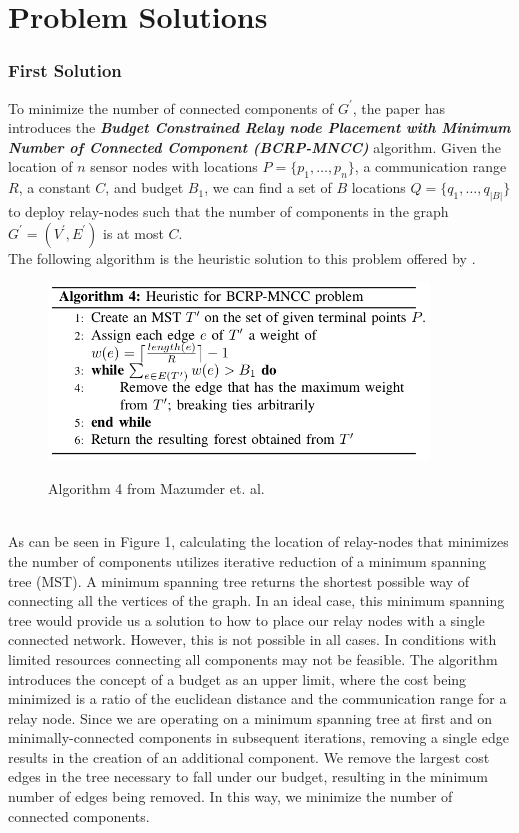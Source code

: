 \documentclass{article}
\begin{document}
\section{Problem Solutions}
\subsubsection*{First Solution}
To minimize the number of connected components of $G^\prime$, the paper \cite{relay-node} has introduces the \textbf{\textit{Budget Constrained Relay node Placement with Minimum Number of Connected Component (BCRP-MNCC)}} algorithm.
Given the location of $n$ sensor nodes with locations $P=\{p_1, \hdots, p_n\}$, a communication range $R$, a constant $C$, and budget $B_1$, we can find a set of $B$ locations $Q=\{q_1, \hdots, q_{|B|}\}$ to deploy relay-nodes such that the number of components in the graph $G^\prime=(V^\prime, E^\prime)$ is at most $C$.\\
The following algorithm is the heuristic solution to this problem offered by \cite{relay-node}.
\begin{figure}[h]
\centering
\includegraphics[width=0.9\textwidth]{Alg4.png}
\label{alg4}
\caption{Algorithm 4 from Mazumder et. al.}
\end{figure}\\
As can be seen in Figure 1, calculating the location of relay-nodes that minimizes the number of components utilizes iterative reduction of a minimum spanning tree (MST).
A minimum spanning tree returns the shortest possible way of connecting all the vertices of the graph.
In an ideal case, this minimum spanning tree would provide us a solution to how to place our relay nodes with a single connected network.
However, this is not possible in all cases.
In conditions with limited resources connecting all components may not be feasible.
The algorithm introduces the concept of a budget as an upper limit, where the cost being minimized is a ratio of the euclidean distance and the communication range for a relay node.
Since we are operating on a minimum spanning tree at first and on minimally-connected components in subsequent iterations, removing a single edge results in the creation of an additional component.
We remove the largest cost edges in the tree necessary to fall under our budget, resulting in the minimum number of edges being removed.
In this way, we minimize the number of connected components.\\
\end{document}
